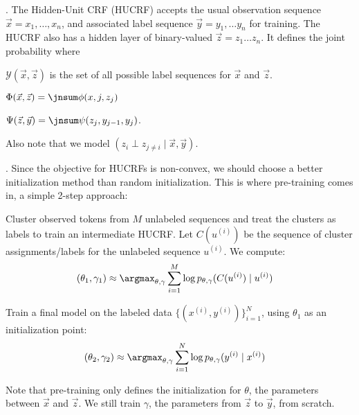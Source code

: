 \documentclass[11pt]{article}
\begin{document}
\p {}. The Hidden-Unit CRF (HUCRF) accepts the usual observation sequence $\vec x = x_1, \ldots, x_n$, and associated label sequence $\vec y = y_1, \ldots y_n$ for training. The HUCRF also has a hidden layer of binary-valued $\vec z = z_1 \ldots z_n$. It defines the joint probability
where
\begin{compactitem}
	\item $\mathcal{Y}(\vec x, \vec z)$ is the set of all possible label sequences for $\vec x$ and $\vec z$. 
	
	\item $\Phi(\vec x, \vec z) = \jnsum \phi(x, j, z_j)$
	
	\item $\Psi(\vec z, \vec y) = \jnsum \psi(z_j, y_{j-1}, y_j)$. 
\end{compactitem}
Also note that we model $(z_i \perp z_{j \ne i} \mid \vec{x}, \vec{y})$. 

\myspace 
\p {}. Since the objective for HUCRFs is non-convex, we should choose a better initialization method than random initialization. This is where pre-training comes in, a simple 2-step approach:
\begin{compactenum}
	\item Cluster observed tokens from $M$ unlabeled sequences and treat the clusters as labels to train an intermediate HUCRF. Let $C(u^{(i)})$ be the sequence of cluster assignments/labels for the unlabeled sequence $u^{(i)}$. We compute:
	\begin{align}
	(\theta_1, \gamma_1) &\approx \argmax_{\theta, \gamma} \sum_{i = 1}^{M} \log p_{\theta, \gamma}(C(u^{(i)}) \mid u^{(i)} )
	\end{align}
	
	\item Train a final model on the labeled data $\{  (x^{(i)}, y^{(i)}  ) \}_{i = 1}^{N}$, using $\theta_1$ as an initialization point:
	\begin{align}
	(\theta_2, \gamma_2) &\approx \argmax_{\theta, \gamma} \sum_{i=1}^{N} \log p_{\theta, \gamma}(y^{(i)} \mid x^{(i)})
	\end{align}
\end{compactenum}
Note that pre-training only defines the initialization for $\theta$, the parameters between $\vec x$ and $\vec z$. We still train $\gamma$, the parameters from $\vec{z}$ to $\vec y$, from scratch. 
\end{document}
